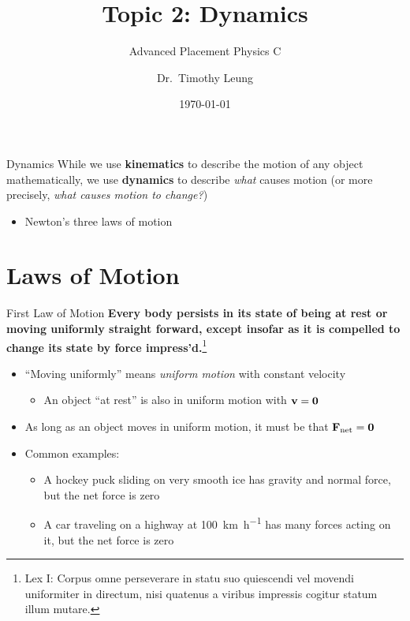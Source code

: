 \documentclass[12pt,compress,aspectratio=169]{beamer}
\title{Topic 2: Dynamics}
\subtitle{Advanced Placement Physics C}
\author[TML]{Dr.\ Timothy Leung}
\institute{Olympiads School}
\date{\today}
\newcommand{\mb}[1]{\ensuremath\mathbf{#1}}
\begin{document}
\begin{frame}
  \maketitle
\end{frame}



\begin{frame}{Dynamics}
  While we use \textbf{kinematics} to describe the motion of any object
  mathematically, we use \textbf{dynamics} to describe \emph{what} causes
  motion (or more precisely, \emph{what causes motion to change?})
  \begin{itemize}
  \item Newton's three laws of motion
  \end{itemize}
\end{frame}



\section{Laws of Motion}

\begin{frame}{First Law of Motion}
  \textbf{Every body persists in its state of being at rest or moving uniformly
    straight forward, except insofar as it is compelled to change its state by
    force impress'd.}\footnote{Lex I: Corpus omne perseverare in statu suo
    quiescendi vel movendi uniformiter in directum, nisi quatenus a viribus
    impressis cogitur statum illum mutare.}
  
  \begin{itemize}
  \item ``Moving uniformly'' means \emph{uniform motion} with constant velocity
    \begin{itemize}
    \item An object ``at rest'' is also in uniform motion with $\mb{v}=\mb{0}$
    \end{itemize}
  \item As long as an object moves in uniform motion, it must be that
    $\mb{F}_\mathrm{net}=\mb{0}$
  \item Common examples:
    \begin{itemize}
    \item A hockey puck sliding on very smooth ice has gravity and normal
      force, but the net force is zero
    \item A car traveling on a highway at \SI{100}{\kilo\metre\per\hour}
      has many forces acting on it, but the net force is zero 
    \end{itemize}
  \end{itemize}
  \vspace{.2in}
\end{frame}
\end{document}

